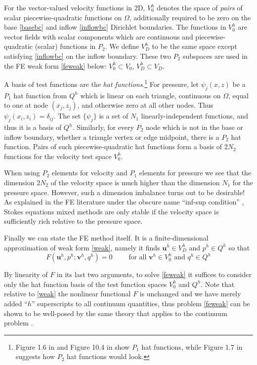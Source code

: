 \documentclass[letterpaper,final,12pt,reqno]{amsart}
\newcommand{\bu}{\mathbf{u}}
\newcommand{\bv}{\mathbf{v}}
\begin{document}
For the vector-valued velocity functions in 2D, $V_0^h$ denotes the space of \emph{pairs} of scalar piecewise-quadratic functions on $\Omega$, additionally required to be zero on the base \eqref{basebc} and inflow \eqref{inflowbc} Dirichlet boundaries.  The functions in $V_0^h$ are vector fields with scalar components which are continuous and piecewise-quadratic (scalar) functions in $P_2$.  We define $V_D^h$ to be the same space except satisfying \eqref{inflowbc} on the inflow boundary.  These two $P_2$ subspaces are used in the FE weak form \eqref{feweak} below: $V_0^h \subset V_0$, $V_D^h \subset V_D$.

A basis of test functions are the \emph{hat functions}.\footnote{Figure 1.6 in \cite{Elmanetal2014} and Figure 10.4 in \cite{Bueler2021} show $P_1$ hat functions, while Figure 1.7 in \cite{Elmanetal2014} suggests how $P_2$ hat functions would look.}  For pressure, let $\psi_j(x,z)$ be a $P_1$ hat function from $Q^h$ which is linear on each triangle, continuous on $\Omega$, equal to one at node $(x_j,z_j)$, and otherwise zero at all other nodes.  Thus $\psi_j(x_i,z_i) = \delta_{ij}$.  The set $\{\psi_j\}$ is a set of $N_1$ linearly-independent functions, and thus it is a basis of $Q^h$.  Similarly, for every $P_2$ node which is not in the base or inflow boundary, whether a triangle vertex or edge midpoint, there is a $P_2$ hat function.  Pairs of such piecewise-quadratic hat functions form a basis of $2N_2$ functions for the velocity test space $V_0^h$.

When using $P_2$ elements for velocity and $P_1$ elements for pressure we see that the dimension $2N_2$ of the velocity space is much higher than the dimension $N_1$ for the pressure space.  However, such a dimension imbalance turns out to be desirable!  As explained in the FE literature under the obscure name ``inf-sup condition'' \cite{Braess2007,Bueler2021,Elmanetal2014}, Stokes equations mixed methods are only stable if the velocity space is sufficiently rich relative to the pressure space.

Finally we can state the FE method itself.  It is a finite-dimensional approximation of weak form \eqref{weak}, namely it finds $\bu^h \in V_D^h$ and $p^h \in Q^h$ so that
\begin{equation}
F(\bu^h,p^h;\bv^h,q^h) = 0 \qquad \text{ for all } \bv^h\in V_0^h \text{ and } q^h\in Q^h  \label{feweak}
\end{equation}

By linearity of $F$ in its last two arguments, to solve \eqref{feweak} it suffices to consider only the hat function basis of the test function spaces $V_0^h$ and $Q^h$.  Note that relative to \eqref{weak} the nonlinear functional $F$ is unchanged and we have merely added ``$h$'' superscripts to all continuum quantities, thus problem \eqref{feweak} can be shown to be well-posed by the same theory that applies to the continuum problem \cite[Theorem 4.3]{JouvetRappaz2011}.
\end{document}
